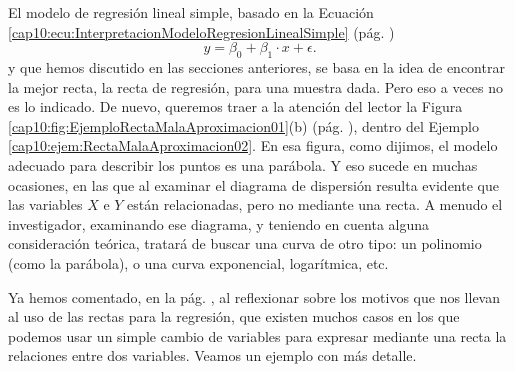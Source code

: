 El modelo de regresión lineal simple, basado en la Ecuación \ref{cap10:ecu:InterpretacionModeloRegresionLinealSimple} (pág. \pageref{cap10:ecu:InterpretacionModeloRegresionLinealSimple})
\[y=\beta_0 +\beta_1\cdot x+\epsilon.\]
y que hemos discutido en las secciones anteriores, se basa en la idea de encontrar la mejor recta, la recta de regresión, para una muestra dada. Pero eso a veces no es lo indicado. De nuevo, queremos traer a la atención del lector la Figura \ref{cap10:fig:EjemploRectaMalaAproximacion01}(b) (pág. \pageref{cap10:fig:EjemploRectaMalaAproximacion01}), dentro del Ejemplo \ref{cap10:ejem:RectaMalaAproximacion02}. En esa figura, como dijimos, el modelo adecuado para describir los puntos es una parábola. Y eso sucede en muchas ocasiones, en las que al examinar el diagrama de dispersión resulta evidente que las variables $X$ e $Y$ están relacionadas, pero no mediante una recta. A menudo el investigador, examinando ese diagrama, y teniendo en cuenta alguna consideración teórica, tratará de buscar una curva de otro tipo: un polinomio (como la parábola), o una curva exponencial, logarítmica, etc.

Ya hemos comentado, en la pág. \pageref{cap10:subsubsec:ReflexionUsoRectaRegresion}, al reflexionar sobre los motivos que nos llevan al uso de las rectas para la regresión,  que existen muchos casos en los que podemos usar un simple cambio de variables para expresar mediante una recta la relaciones entre dos variables. Veamos un ejemplo con más detalle.

